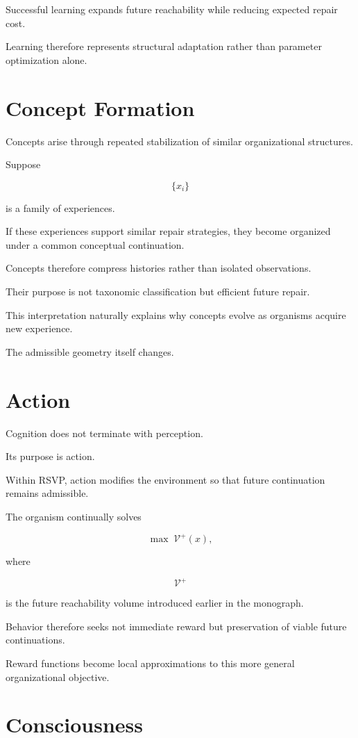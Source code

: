 \documentclass[11pt,oneside]{book}
\numberwithin{equation}{chapter}
\theoremstyle{definition}
\theoremstyle{plain}
\begin{document}
Successful learning expands future reachability while reducing expected
repair cost.

Learning therefore represents structural adaptation rather than parameter
optimization alone.

\section{Concept Formation}

Concepts arise through repeated stabilization of similar organizational
structures.

Suppose

\[
\{x_i\}
\]

is a family of experiences.

If these experiences support similar repair strategies, they become
organized under a common conceptual continuation.

Concepts therefore compress histories rather than isolated observations.

Their purpose is not taxonomic classification but efficient future repair.

This interpretation naturally explains why concepts evolve as organisms
acquire new experience.

The admissible geometry itself changes.

\section{Action}

Cognition does not terminate with perception.

Its purpose is action.

Within RSVP, action modifies the environment so that future continuation
remains admissible.

The organism continually solves

\[
\max \; \mathcal V^+(x),
\]

where

\[
\mathcal V^+
\]

is the future reachability volume introduced earlier in the monograph.

Behavior therefore seeks not immediate reward but preservation of viable
future continuations.

Reward functions become local approximations to this more general
organizational objective.

\section{Consciousness}
\end{document}
